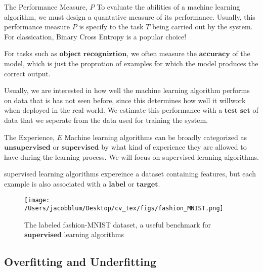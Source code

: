 \documentclass{beamer}
\begin{document}
\begin{frame}[plain]{The Performance Measure, $P$}
To evaluate the abilities of a machine learning algorithm, we must design a quantative measure of its performance. Usually, this performance measure $P$ is specify
to the task $T$ being carried out by the system. For classication, Binary Cross Entropy is a popular choice!

For tasks such as $\textbf{object recogniztion}$, we often measure the $\textbf{accuracy}$ of the model, which is just the proprotion of examples for which the model produces the correct output. 

Usually, we are interested in how well the machine learning algorithm performs on data that is has not seen before, since this determines how well it willwork when deployed in the real world.
We estimate this performance with a $\textbf{test set}$ of data that we seperate from the data used for training the system.
\end{frame}

\begin{frame}[plain]{The Experience, $E$}
Machine learning algorithms can be broadly categorized as $\textbf{unsupervised}$ or $\textbf{supervised}$ by what kind of experience they are allowed to have during the learning process. We will focus
on supervised leraning algorithms.

\begin{definition}
    supervised learning algorithms expereince a dataset containing features, but each example is also associated with a $\textbf{label}$ or $\textbf{target}$.
\end{definition}

\begin{figure}
    \centering
        \texttt{[image: /Users/jacobblum/Desktop/cv\_tex/figs/fashion\_MNIST.png]}
        \caption{The labeled fashion-MNIST dataset, a useful benchmark for $\textbf{supervised}$ learning algorithms}
    \end{figure}
\end{frame}

\subsection{Overfitting and Underfitting}
\end{document}
